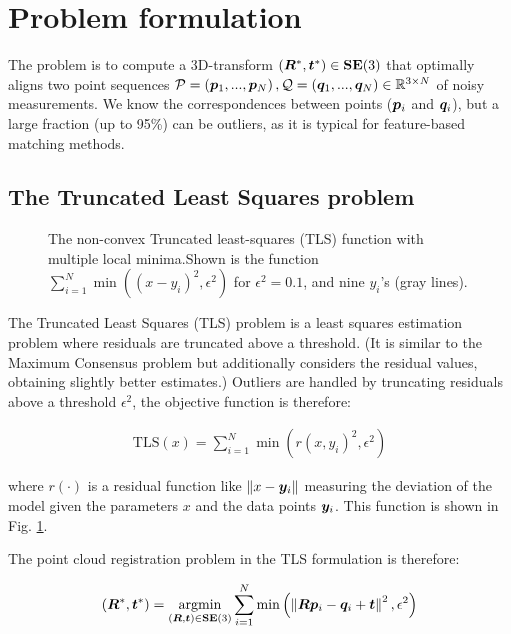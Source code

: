 
\section{Problem formulation}
The problem is to compute a 3D-transform $({\bm R}^*, \boldsymbol{t}^*) \in \mathbf{SE(\textrm{3})}$ that optimally aligns two point sequences $\mathcal{P} = \left(\boldsymbol{p}_1, ..., \boldsymbol{p}_N\right), \mathcal{Q} = \left(\boldsymbol{q}_1, ..., \boldsymbol{q}_N\right) \in \mathbb{R}^{3 \times N}$ of noisy measurements. We know the correspondences between points ($\boldsymbol{p}_i$ and $\boldsymbol{q}_i$), but a large fraction (up to 95\%) can be outliers, as it is typical for feature-based matching methods.
\subsection{The Truncated Least Squares problem}
\begin{figure}[!ht]
	\centering
	\begin{adjustbox}{width=1.\linewidth}
		
	\end{adjustbox}
	\caption{The non-convex Truncated least-squares (TLS) function with multiple local minima.Shown is the function  $\sum_{i=1}^{N}\min((x - y_i)^2, \epsilon^2)$ for $\epsilon^2=0.1$, and nine $y_i$'s (gray lines).}
	\label{fig:tlscostmulterm}
\end{figure}

The Truncated Least Squares (TLS) problem is a least squares estimation problem where residuals are truncated above a threshold. (It is similar to the Maximum Consensus problem but additionally considers the residual values, obtaining slightly better estimates.)
Outliers are handled by truncating residuals above a threshold $\epsilon^2$, the objective function is therefore:


\begin{equation}
	\begin{aligned}
		\text{TLS}(x) = \sum_{i=1}^{N}\min(r(x, y_i)^2, \epsilon^2)
	\end{aligned}
\end{equation}

where $r(\cdot)$ is a residual function like $\left\| x - \boldsymbol{y}_i \right\|$ measuring the deviation of the model given the parameters $x$ and the data points $\boldsymbol{y}_i$. This function is shown in Fig. \ref{fig:tlscostmulterm}.

The point cloud registration problem in the TLS formulation is therefore:

\begin{equation}
	\label{eq:pcr-tls}
	\begin{aligned}
		({\bm R}^*, \boldsymbol{t}^*) =  \operatorname*{argmin}_{({\bm R}, \boldsymbol{t}) \in \mathbf{SE(\textrm{3})}}  \sum_{i=1}^{N} \min \left(\left\|{\bm R} \boldsymbol{p}_i  - \boldsymbol{q}_i  + \boldsymbol{t}\right\|^2, \epsilon^2 \right)
	\end{aligned}
\end{equation}

